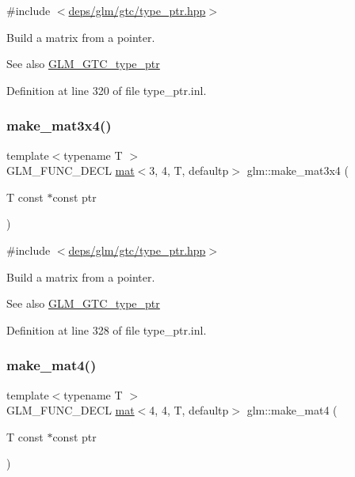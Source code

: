{\ttfamily \#include $<$\hyperlink{type__ptr_8hpp}{deps/glm/gtc/type\+\_\+ptr.\+hpp}$>$}

Build a matrix from a pointer. \begin{DoxySeeAlso}{See also}
\hyperlink{group__gtc__type__ptr}{G\+L\+M\+\_\+\+G\+T\+C\+\_\+type\+\_\+ptr} 
\end{DoxySeeAlso}


Definition at line 320 of file type\+\_\+ptr.\+inl.

\mbox{\label{group__gtc__type__ptr_ga05dd66232aedb993e3b8e7b35eaf932b}} 
\subsubsection{\texorpdfstring{make\+\_\+mat3x4()}{make\_mat3x4()}}
{\footnotesize\ttfamily template$<$typename T $>$ \\
G\+L\+M\+\_\+\+F\+U\+N\+C\+\_\+\+D\+E\+CL \hyperlink{structglm_1_1mat}{mat}$<$3, 4, T, defaultp$>$ glm\+::make\+\_\+mat3x4 (\begin{DoxyParamCaption}\item[{T const $\ast$const}]{ptr }\end{DoxyParamCaption})}



{\ttfamily \#include $<$\hyperlink{type__ptr_8hpp}{deps/glm/gtc/type\+\_\+ptr.\+hpp}$>$}

Build a matrix from a pointer. \begin{DoxySeeAlso}{See also}
\hyperlink{group__gtc__type__ptr}{G\+L\+M\+\_\+\+G\+T\+C\+\_\+type\+\_\+ptr} 
\end{DoxySeeAlso}


Definition at line 328 of file type\+\_\+ptr.\+inl.

\mbox{\label{group__gtc__type__ptr_gae7bcedb710d1446c87fd1fc93ed8ee9a}} 
\subsubsection{\texorpdfstring{make\+\_\+mat4()}{make\_mat4()}}
{\footnotesize\ttfamily template$<$typename T $>$ \\
G\+L\+M\+\_\+\+F\+U\+N\+C\+\_\+\+D\+E\+CL \hyperlink{structglm_1_1mat}{mat}$<$4, 4, T, defaultp$>$ glm\+::make\+\_\+mat4 (\begin{DoxyParamCaption}\item[{T const $\ast$const}]{ptr }\end{DoxyParamCaption})}



